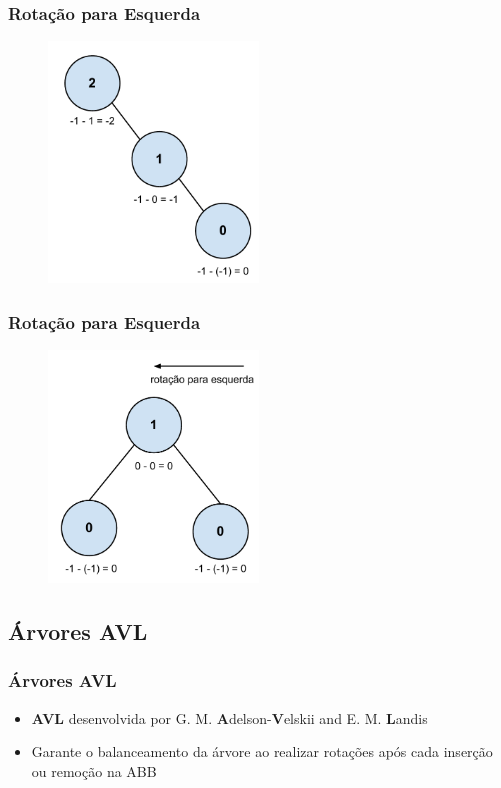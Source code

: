\begin{frame}
    \frametitle{Rotação para Esquerda}
    
    \begin{figure}[tbp]
    \includegraphics[keepaspectratio=true,width=2.2in]{figs/fig_arvores/Balanceamento_Arvore4}
    \centering
    \end{figure}
\end{frame}

\begin{frame}
    \frametitle{Rotação para Esquerda}
    
    \begin{figure}[tbp]
    \includegraphics[keepaspectratio=true,width=2.2in]{figs/fig_arvores/Balanceamento_Arvore5}
    \centering
    \end{figure}
\end{frame}

\subsection{Árvores AVL}

\begin{frame}
    \frametitle{Árvores AVL}
    
    \begin{itemize}
    \item \textbf{AVL} desenvolvida por G. M. \textbf{A}delson-\textbf{V}elskii and E. M. \textbf{L}andis
    \item Garante o balanceamento da árvore ao realizar rotações após cada inserção ou remoção na ABB
    \end{itemize}
\end{frame}

